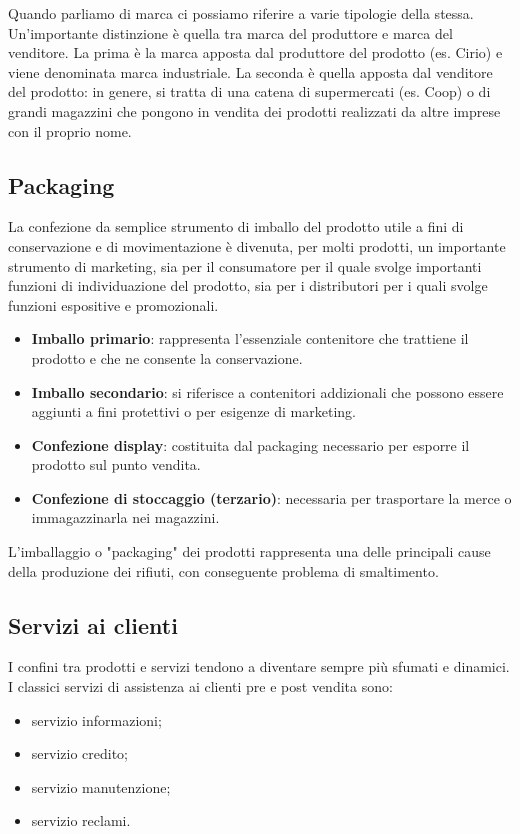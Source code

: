 Quando parliamo di marca ci possiamo riferire a varie tipologie della stessa. Un’importante distinzione è quella tra marca del produttore e marca del venditore. La prima è la marca apposta dal produttore del prodotto (es. Cirio) e viene denominata marca industriale. La seconda è quella apposta dal venditore del prodotto: in genere, si tratta di una catena di supermercati (es. Coop) o di grandi magazzini che pongono in vendita dei prodotti realizzati da altre imprese con il proprio nome.

\subsection{Packaging}
La confezione da semplice strumento di imballo del prodotto utile a fini di conservazione e di movimentazione è divenuta, per molti prodotti, un importante strumento di marketing, sia per il consumatore per il quale svolge importanti funzioni di individuazione del prodotto, sia per i distributori per i quali svolge funzioni espositive e promozionali.

\begin{itemize}
	\item \textbf{Imballo primario}: rappresenta l’essenziale contenitore che trattiene il prodotto e che ne consente la conservazione.
	\item \textbf{Imballo secondario}: si riferisce a contenitori addizionali che possono essere aggiunti a fini protettivi o per esigenze di marketing.
	\item \textbf{Confezione display}: costituita dal packaging necessario per esporre il prodotto sul punto vendita.
	\item \textbf{Confezione di stoccaggio (terzario)}: necessaria per trasportare la merce o immagazzinarla nei magazzini.
\end{itemize}

L'imballaggio o "packaging" dei prodotti rappresenta una delle principali cause della produzione dei rifiuti, con conseguente problema di smaltimento.

\subsection{Servizi ai clienti}
I confini tra prodotti e servizi tendono a diventare sempre più sfumati e dinamici.
I classici servizi di assistenza ai clienti pre e post vendita sono:
\begin{itemize}
	\item servizio informazioni;
	\item servizio credito;
	\item servizio manutenzione;
	\item servizio reclami.
\end{itemize}

